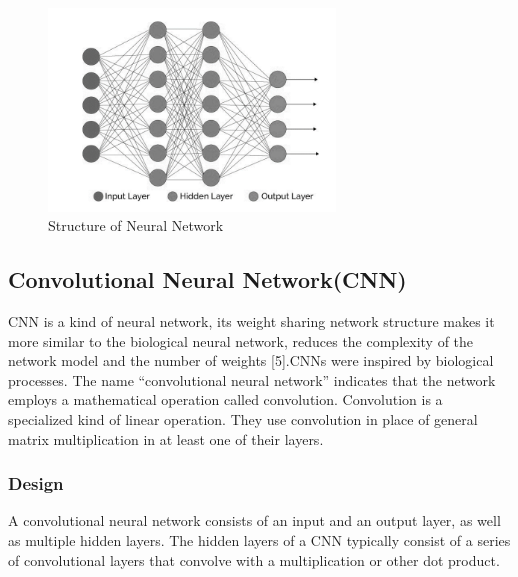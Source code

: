 \begin{figure}[tbh] %
\begin{center}
	\includegraphics[width = 3in]{images/structure.png}
	\caption{Structure of Neural Network} %
	\label{figStructure of Neural Network} %
\end{center}
\end{figure}

\subsection{Convolutional Neural Network(CNN)}
CNN is a kind of neural network, its weight sharing network structure makes it more similar to the
biological neural network, reduces the complexity of the network model and the
number of weights [5].CNNs were inspired by biological processes. The name
“convolutional neural network” indicates that the network employs a
mathematical operation called convolution. Convolution is a specialized kind of
linear operation. They use convolution in place of general matrix multiplication in at least one of their layers.

\subsubsection{Design}
A convolutional neural network consists of an input and an output layer, as well as multiple hidden layers. The hidden layers of a CNN typically consist of a series of convolutional layers that convolve with a multiplication or other dot product.
\pagebreak

